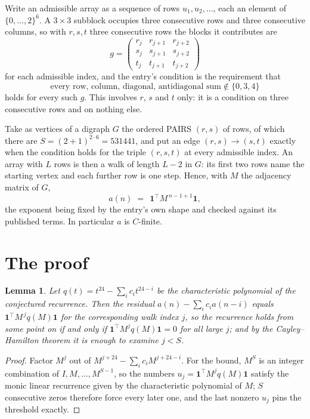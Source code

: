 \documentclass[11pt,a4paper]{article}
\theoremstyle{plain}
\newtheorem{lemma}[theorem]{Lemma}
\theoremstyle{definition}
\begin{document}
Write an admissible array as a sequence of rows $u_1,u_2,\dots$, each an element of
$\{0,\dots,2\}^{6}$. A $3\times3$ subblock occupies three consecutive rows and
three consecutive columns, so with $r,s,t$ three consecutive rows the blocks it
contributes are
\[
g=\begin{pmatrix}r_j&r_{j+1}&r_{j+2}\\ s_j&s_{j+1}&s_{j+2}\\ t_j&t_{j+1}&t_{j+2}\end{pmatrix}
\]
for each admissible index, and the entry's condition is the requirement that
\[
\text{every row, column, diagonal, antidiagonal sum} \notin \{0,3,4\}
\]
holds for every such $g$. This involves $r$, $s$ and $t$ only: it is a condition on
three consecutive rows and on nothing else.

Take as vertices of a digraph $G$ the ordered PAIRS $(r,s)$ of rows, of which there are
$S=(2+1)^{2\cdot6}=531441$, and put an edge $(r,s)\to(s,t)$ exactly when the condition
holds for the triple $(r,s,t)$ at every admissible index. An array with $L$ rows is then a
walk of length $L-2$ in $G$: its first two rows name the starting vertex and each further
row is one step. Hence, with $M$ the adjacency matrix of $G$,
\[
a(n)\;=\;\,\mathbf{1}^{\!\top}M^{\,n-1+1}\mathbf{1},
\]
the exponent being fixed by the entry's own shape and checked against its published terms.
In particular $a$ is $C$-finite.

\section{The proof}

\begin{lemma}\label{lem:crit}
Let $q(t)=t^{24}-\sum_i c_it^{24-i}$ be the characteristic polynomial of the
conjectured recurrence. Then the residual $a(n)-\sum_ic_ia(n-i)$ equals
$\mathbf{1}^{\!\top}M^{\,j}q(M)\mathbf{1}$ for the corresponding walk index
$j$, so the recurrence holds from some point on if and only if
$\mathbf{1}^{\!\top}M^{j}q(M)\mathbf{1}=0$ for all large $j$; and by the
Cayley--Hamilton theorem it is enough to examine $j<S$.
\end{lemma}

\begin{proof}
Factor $M^{j}$ out of $M^{j+24}-\sum_ic_iM^{j+24-i}$. For the bound, $M^{S}$
is an integer combination of $I,M,\dots,M^{S-1}$, so the numbers
$u_j=\mathbf{1}^{\!\top}M^{j}q(M)\mathbf{1}$ satisfy the monic linear recurrence given by
the characteristic polynomial of $M$; $S$ consecutive zeros therefore force every later one,
and the last nonzero $u_j$ pins the threshold exactly.
\end{proof}
\end{document}
